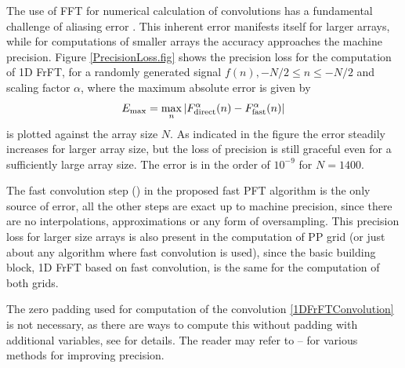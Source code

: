 \documentclass{UCF_ETD}
\begin{document}
{ 
 The use of FFT for  numerical calculation of convolutions has a %
 fundamental challenge of aliasing error \cite{Peter2008}. This inherent error manifests itself for larger arrays, while for  computations of smaller arrays the accuracy approaches the machine precision. Figure \ref{PrecisionLoss.fig} shows the precision loss for the computation of 1D FrFT, for a randomly generated signal $f(n), -N/2\leq n\leq -N/2$ and scaling factor $\alpha$, where the maximum absolute error is given by
 \begin{eqnarray} \label{AbsoluteError}
 E_{\max} = \max_n|F^{\alpha}_{\rm direct}(n) - F^{\alpha}_{\rm fast}(n) |
 \end{eqnarray}
 is plotted against the array size $N$. As indicated in the figure the error steadily increases for larger array size, but the loss of precision is still graceful even for a sufficiently large array size. The error is in the order of $10^{-9}$ for $N = 1400$.
 
 
 
 
 The fast convolution step (\cite{Pavel2013, Pavel2011}) in the proposed fast PFT algorithm is the only source of error, all the other steps are exact up to machine precision,  since there are no interpolations, approximations or any form of oversampling. This precision loss for larger size arrays is also present in the computation of PP grid (or just about any algorithm where fast convolution is used),  since the basic building block, 1D FrFT based on fast convolution,  is the same for the computation of both grids.
 
 
 The zero padding used for computation of the convolution \eqref{1DFrFTConvolution} is not necessary, as there are ways to compute this without padding with additional variables, see \cite{Bowman2011} for details. The reader may refer to \cite{Pavel2013}--\cite{Jerri1992} for various methods for improving precision.
 
}
\end{document}
